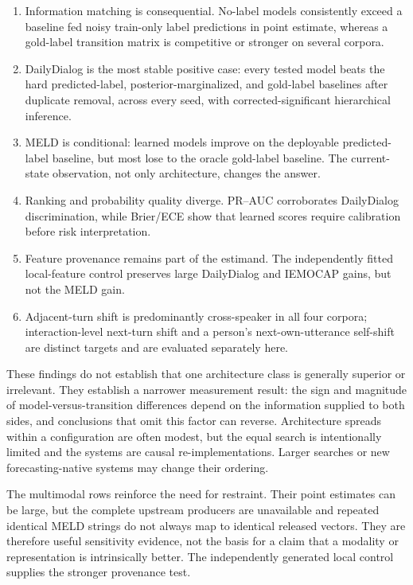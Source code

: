 \documentclass{ieeeaccess}
\begin{document}
\begin{enumerate}
\item Information matching is consequential. No-label models consistently exceed a baseline fed
noisy train-only label predictions in point estimate, whereas a gold-label transition matrix is
competitive or stronger on several corpora.
\item DailyDialog is the most stable positive case: every tested model beats the hard predicted-label,
posterior-marginalized, and gold-label baselines after duplicate removal, across every seed, with
corrected-significant hierarchical inference.
\item MELD is conditional: learned models improve on the deployable predicted-label baseline, but
most lose to the oracle gold-label baseline. The current-state observation, not only architecture,
changes the answer.
\item Ranking and probability quality diverge. PR--AUC corroborates DailyDialog discrimination,
while Brier/ECE show that learned scores require calibration before risk interpretation.
\item Feature provenance remains part of the estimand. The independently fitted local-feature
control preserves large DailyDialog and IEMOCAP gains, but not the MELD gain.
\item Adjacent-turn shift is predominantly cross-speaker in all four corpora; interaction-level
next-turn shift and a person's next-own-utterance self-shift are distinct targets and are evaluated
separately here.
\end{enumerate}

These findings do not establish that one architecture class is generally superior or irrelevant.
They establish a narrower measurement result: the sign and magnitude of model-versus-transition
differences depend on the information supplied to both sides, and conclusions that omit this
factor can reverse. Architecture spreads within a configuration are often modest, but the equal
search is intentionally limited and the systems are causal re-implementations. Larger searches or
new forecasting-native systems may change their ordering.

The multimodal rows reinforce the need for restraint. Their point estimates can be large, but the
complete upstream producers are unavailable and repeated identical MELD strings do not always map
to identical released vectors. They are therefore useful sensitivity evidence, not the basis for a
claim that a modality or representation is intrinsically better. The independently generated local
control supplies the stronger provenance test.
\end{document}
